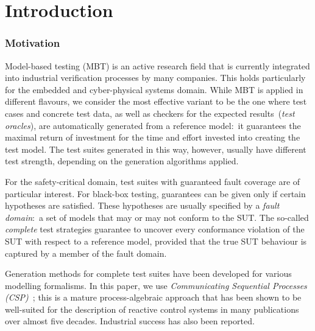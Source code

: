 
\section{Introduction}
\label{sec:intro}


\subsubsection*{Motivation}

Model-based testing (MBT) is an  active research field that is currently
integrated into industrial verification processes by many companies. This
holds particularly for the embedded and cyber-physical systems domain. While
MBT is applied in different flavours, we consider the most effective variant
to be the one where test cases and concrete test data, as well as checkers
for the expected results~(\emph{test oracles}), are automatically generated
from a reference model:~it guarantees the maximal return of investment for
the time and effort invested into creating the test model. The test suites
generated in this way, however, usually have different test strength,
depending on the generation algorithms applied.

For the safety-critical domain, test suites with guaranteed fault coverage
are of particular interest. For black-box testing, guarantees can be given
only if certain hypotheses are satisfied. These hypotheses are usually
specified by a \emph{fault domain}:~a set of models that may or may not
conform to the SUT. The so-called \emph{complete} test strategies guarantee
to uncover every conformance violation of the SUT with respect to a reference
model, provided that the true SUT behaviour is captured by a member of the
fault domain.

Generation methods for complete test suites have been developed for various
modelling formalisms. In this paper, we use \emph{Communicating Sequential
Processes (CSP)}~\cite{Hoare:1985:CSP:3921,Roscoe2010}; this is a mature
process-algebraic approach that has been shown to be well-suited for the
description of reactive control systems in many publications over almost five
decades. Industrial success has also been reported.


